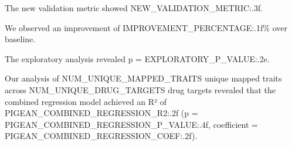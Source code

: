 

The new validation metric showed {{NEW_VALIDATION_METRIC:.3f}}.

We observed an improvement of {{IMPROVEMENT_PERCENTAGE:.1f}}\% over baseline.

The exploratory analysis revealed p = {{EXPLORATORY_P_VALUE:.2e}}.



Our analysis of {{NUM_UNIQUE_MAPPED_TRAITS}} unique mapped traits
across {{NUM_UNIQUE_DRUG_TARGETS}} drug targets revealed that
the combined regression model achieved an R² of {{PIGEAN_COMBINED_REGRESSION_R2:.2f}}
(p = {{PIGEAN_COMBINED_REGRESSION_P_VALUE:.4f}},
coefficient = {{PIGEAN_COMBINED_REGRESSION_COEF:.2f}}).


%
